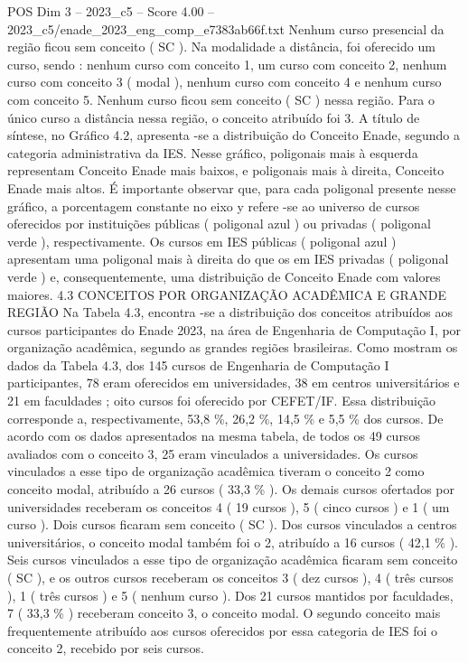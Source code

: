 \begin{textsample}{POS Dim 3 – 2023\_c5 – Score 4.00 – 2023\_c5/enade\_2023\_eng\_comp\_e7383ab66f.txt}
Nenhum curso presencial da região ficou sem conceito ( SC ).
Na modalidade a distância, foi oferecido um curso, sendo : nenhum curso com conceito 1, um curso com conceito 2, nenhum curso com conceito 3 ( modal ), nenhum curso com conceito 4 e nenhum curso com conceito 5.
Nenhum curso ficou sem conceito ( SC ) nessa região.
Para o único curso a distância nessa região, o conceito atribuído foi 3.
A título de síntese, no Gráfico 4.2, apresenta -se a distribuição do Conceito Enade, segundo a categoria administrativa da IES.
Nesse gráfico, poligonais mais à esquerda representam Conceito Enade mais baixos, e poligonais mais à direita, Conceito Enade mais altos.
É importante observar que, para cada poligonal presente nesse gráfico, a porcentagem constante no eixo y refere -se ao universo de cursos oferecidos por instituições públicas ( poligonal azul ) ou privadas ( poligonal verde ), respectivamente.
Os cursos em IES públicas ( poligonal azul ) apresentam uma poligonal mais à direita do que os em IES privadas ( poligonal verde ) e, consequentemente, uma distribuição de Conceito Enade com valores maiores. 4.3 CONCEITOS POR ORGANIZAÇÃO ACADÊMICA E GRANDE REGIÃO Na Tabela 4.3, encontra -se a distribuição dos conceitos atribuídos aos cursos participantes do Enade 2023, na área de Engenharia de Computação I, por organização acadêmica, segundo as grandes regiões brasileiras.
Como mostram os dados da Tabela 4.3, dos 145 cursos de Engenharia de Computação I participantes, 78 eram oferecidos em universidades, 38 em centros universitários e 21 em faculdades ; oito cursos foi oferecido por CEFET/IF.
Essa distribuição corresponde a, respectivamente, 53,8 \%, 26,2 \%, 14,5 \% e 5,5 \% dos cursos.
De acordo com os dados apresentados na mesma tabela, de todos os 49 cursos avaliados com o conceito 3, 25 eram vinculados a universidades.
Os cursos vinculados a esse tipo de organização acadêmica tiveram o conceito 2 como conceito modal, atribuído a 26 cursos ( 33,3 \% ).
Os demais cursos ofertados por universidades receberam os conceitos 4 ( 19 cursos ), 5 ( cinco cursos ) e 1 ( um curso ).
Dois cursos ficaram sem conceito ( SC ).
Dos cursos vinculados a centros universitários, o conceito modal também foi o 2, atribuído a 16 cursos ( 42,1 \% ).
Seis cursos vinculados a esse tipo de organização acadêmica ficaram sem conceito ( SC ), e os outros cursos receberam os conceitos 3 ( dez cursos ), 4 ( três cursos ), 1 ( três cursos ) e 5 ( nenhum curso ).
Dos 21 cursos mantidos por faculdades, 7 ( 33,3 \% ) receberam conceito 3, o conceito modal.
O segundo conceito mais frequentemente atribuído aos cursos oferecidos por essa categoria de IES foi o conceito 2, recebido por seis cursos.

\end{textsample}
